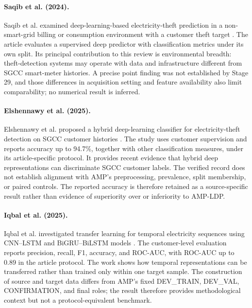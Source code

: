 \paragraph{Saqib et al. (2024).}
Saqib et al. examined deep-learning-based electricity-theft prediction in a non-smart-grid billing or consumption environment with a customer theft target \cite{Saqib2024NonSmartGrid}. The article evaluates a supervised deep predictor with classification metrics under its own split. Its principal contribution to this review is environmental breadth: theft-detection systems may operate with data and infrastructure different from SGCC smart-meter histories. A precise point finding was not established by Stage 29, and those differences in acquisition setting and feature availability also limit comparability; no numerical result is inferred.

\paragraph{Elshennawy et al. (2025).}
Elshennawy et al. proposed a hybrid deep-learning classifier for electricity-theft detection on SGCC customer histories \cite{Elshennawy2025EfficientETD}. The study uses customer supervision and reports accuracy up to 94.7\%, together with other classification measures, under its article-specific protocol. It provides recent evidence that hybrid deep representations can discriminate SGCC customer labels. The verified record does not establish alignment with AMP's preprocessing, prevalence, split membership, or paired controls. The reported accuracy is therefore retained as a source-specific result rather than evidence of superiority over or inferiority to AMP-LDP.

\paragraph{Iqbal et al. (2025).}
Iqbal et al. investigated transfer learning for temporal electricity sequences using CNN--LSTM and BiGRU--BiLSTM models \cite{Iqbal2025TransferTemporal}. The customer-level evaluation reports precision, recall, F1, accuracy, and ROC-AUC, with ROC-AUC up to 0.89 in the article protocol. The work shows how temporal representations can be transferred rather than trained only within one target sample. The construction of source and target data differs from AMP's fixed DEV\_TRAIN, DEV\_VAL, CONFIRMATION, and final roles; the result therefore provides methodological context but not a protocol-equivalent benchmark.

